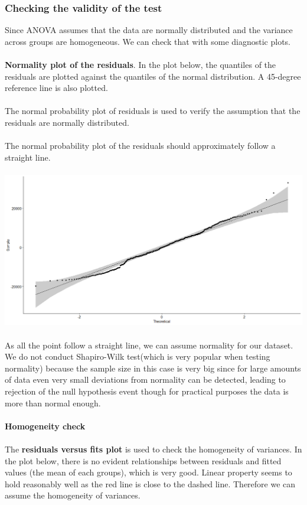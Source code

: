 \documentclass[a4paper]{article}
\begin{document}
\subsubsection{Checking the validity of the test}
Since ANOVA assumes that the data are normally distributed and the variance across groups are homogeneous. We can check that with some diagnostic plots.\\ \\
\textbf{Normality plot of the residuals}. In the plot below, the quantiles of the residuals are plotted against the quantiles of the normal distribution. A 45-degree reference line is also plotted.\\ \\
The normal probability plot of residuals is used to verify the assumption that the residuals are normally distributed.\\ \\
The normal probability plot of the residuals should approximately follow a straight line.\\ \\
\includegraphics[width=14cm]{img/normality.png} \\ \\
As all the point follow a straight line, we can assume normality for our dataset. We do not conduct Shapiro-Wilk test(which is very popular when testing normality) because the sample size in this case is very big since for large amounts of data even very small deviations from normality can be detected, leading to rejection of the null hypothesis event though for practical purposes the data is more than normal enough. \\ \\
\textbf{Homogeneity check} \\ \\
The \textbf{residuals versus fits plot} is used to check the homogeneity of variances. In the plot below, there is no evident relationships between residuals and fitted values (the mean of each groups), which is very good. Linear property seems to hold reasonably well as the red line is close to the dashed line. Therefore we can assume the homogeneity of variances. \\
\end{document}
